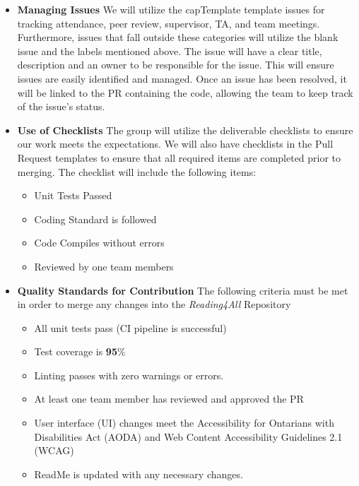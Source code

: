 \documentclass{article}
\begin{document}
\begin{itemize}
   \item \textbf{Managing Issues}\newline
  We will utilize the capTemplate template issues for tracking attendance, peer review, supervisor, TA, and team meetings. Furthermore, issues that fall outside these categories will utilize the blank issue and the labels mentioned above. \newline
  The issue will have a clear title, description and an owner to be responsible for the issue. This will ensure issues are easily identified and managed. Once an issue has been resolved, it will be linked to the PR containing the code, allowing the team to keep track of the issue's status.  
  \item \textbf{Use of Checklists} \newline
  The group will utilize the deliverable checklists to ensure our work meets the expectations. 
  We will also have checklists in the Pull Request templates to ensure that all required items are completed prior to merging. The checklist will include the following items: 
  \begin{itemize}
    \item Unit Tests Passed
    \item Coding Standard is followed 
    \item Code Compiles without errors
    \item Reviewed by one team members
  \end{itemize}
  \item \textbf{Quality Standards for Contribution}\newline
  The following criteria must be met in order to merge any changes into the \textit{Reading4All} Repository
  \begin{itemize}
    \item All unit tests pass (CI pipeline is successful)
    \item Test coverage is \textbf{95}\%
    \item Linting passes with zero warnings or errors. 
    \item At least one team member has reviewed and approved the PR
    \item User interface (UI) changes meet the Accessibility for Ontarians with Disabilities Act (AODA) and Web Content Accessibility Guidelines 2.1 (WCAG)
    \item ReadMe is updated with any necessary changes. 
  \end{itemize}
  
  \end{itemize}
\end{document}
